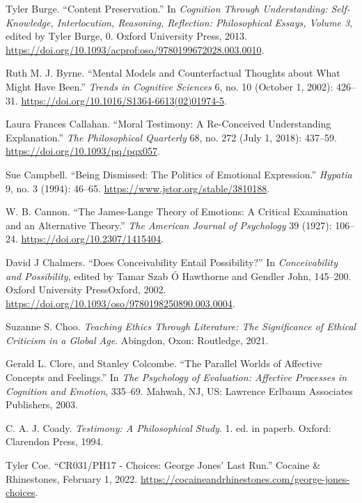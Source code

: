 \documentclass[phdthesis,12pt,final,a4paper]{wuthesis}
\newlength{\cslhangindent}
\newenvironment{CSLReferences}[2] %
{\begin{list}{}{%
	\setlength{\itemindent}{0pt}
	\setlength{\leftmargin}{0pt}
	\setlength{\parsep}{0pt}
	\ifodd #1
	\setlength{\leftmargin}{\cslhangindent}
	\setlength{\itemindent}{-1\cslhangindent}
	\fi
	\setlength{\itemsep}{#2\baselineskip}}}
{\end{list}}
\theoremstyle{definition}
\theoremstyle{definition}
\theoremstyle{definition}
\theoremstyle{definition}
\theoremstyle{remark}
\begin{document}
\begin{CSLReferences}{1}{0}
Tyler Burge. {``Content {Preservation}.''} In \emph{Cognition {Through Understanding}: {Self-Knowledge}, {Interlocution}, {Reasoning}, {Reflection}: {Philosophical Essays}, {Volume} 3}, edited by Tyler Burge, 0. Oxford University Press, 2013. \url{https://doi.org/10.1093/acprof:oso/9780199672028.003.0010}.

Ruth M. J. Byrne. {``Mental Models and Counterfactual Thoughts about What Might Have Been.''} \emph{Trends in Cognitive Sciences} 6, no. 10 (October 1, 2002): 426--31. \url{https://doi.org/10.1016/S1364-6613(02)01974-5}.

Laura Frances Callahan. {``Moral {Testimony}: {A Re-Conceived Understanding Explanation}.''} \emph{The Philosophical Quarterly} 68, no. 272 (July 1, 2018): 437--59. \url{https://doi.org/10.1093/pq/pqx057}.

Sue Campbell. {``Being {Dismissed}: {The Politics} of {Emotional Expression}.''} \emph{Hypatia} 9, no. 3 (1994): 46--65. \url{https://www.jstor.org/stable/3810188}.

W. B. Cannon. {``The {James-Lange} Theory of Emotions: A Critical Examination and an Alternative Theory.''} \emph{The American Journal of Psychology} 39 (1927): 106--24. \url{https://doi.org/10.2307/1415404}.

David J Chalmers. {``Does {Conceivability Entail Possibility}?''} In \emph{Conceivability and {Possibility}}, edited by Tamar Szab Ó Hawthorne and Gendler John, 145--200. Oxford University PressOxford, 2002. \url{https://doi.org/10.1093/oso/9780198250890.003.0004}.

Suzanne S. Choo. \emph{Teaching Ethics Through Literature: The Significance of Ethical Criticism in a Global Age}. Abingdon, Oxon: Routledge, 2021.

Gerald L. Clore, and Stanley Colcombe. {``The Parallel Worlds of Affective Concepts and Feelings.''} In \emph{The Psychology of Evaluation: {Affective} Processes in Cognition and Emotion}, 335--69. Mahwah, NJ, US: Lawrence Erlbaum Associates Publishers, 2003.

C. A. J. Coady. \emph{Testimony: A Philosophical Study}. 1. ed. in paperb. Oxford: Clarendon Press, 1994.

Tyler Coe. {``{CR031}/{PH17} - {Choices}: {George Jones}' {Last Run}.''} Cocaine \& Rhinestones, February 1, 2022. \url{https://cocaineandrhinestones.com/george-jones-choices}.


\end{CSLReferences}
\end{document}
